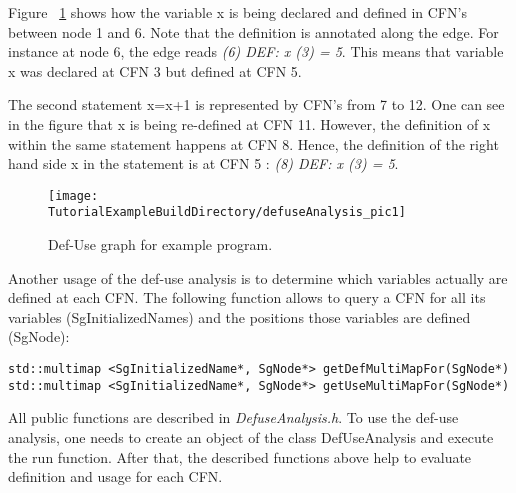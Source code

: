 Figure ~\ref{Tutorial:exampledefuse} shows how the variable x is being
declared and defined in CFN's between node 1 and 6. Note that the definition
is annotated along the edge. For instance at node 6, the edge reads 
\emph{(6) DEF: x (3) = 5}. This means that variable x was declared at CFN 3 but
defined at CFN 5.

The second statement x=x+1 is represented by CFN's from 7 to 12.
One can see in the figure that x is being re-defined at CFN 11. However,
the definition of x within the same statement happens at CFN 8. Hence, the 
definition of the right hand side x in the statement is at CFN 5 :
\emph{(8) DEF: x (3) = 5}.

\begin{figure}
\texttt{[image: \\TutorialExampleBuildDirectory/defuseAnalysis\_pic1]}
\caption{Def-Use graph for example program.}
\label{Tutorial:exampledefuse}
\end{figure}

Another usage of the def-use analysis is to determine which variables actually
are defined at each CFN. The following function allows to query a CFN for
all its variables (SgInitializedNames) and the positions those variables are defined
(SgNode):

\begin{verbatim}
std::multimap <SgInitializedName*, SgNode*> getDefMultiMapFor(SgNode*)
std::multimap <SgInitializedName*, SgNode*> getUseMultiMapFor(SgNode*)
\end{verbatim}

All public functions are described in \emph{DefuseAnalysis.h}. To use the def-use 
analysis, one needs to create an object of the class DefUseAnalysis and execute
the run function. After that, the described functions above help to evaluate 
definition and usage for each CFN.




